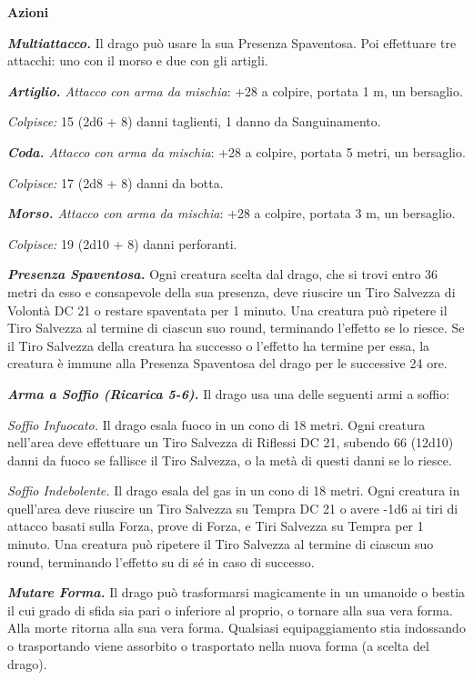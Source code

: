 \begin{multicols}{2}
	\textbf{Azioni}

	\textit{\textbf{Multiattacco.}} Il drago può usare la sua Presenza Spaventosa. Poi effettuare tre attacchi: uno con il morso e due con gli artigli.

	\textit{\textbf{Artiglio.} Attacco con arma da mischia}: +28 a colpire, portata 1 m, un bersaglio.

	\textit{Colpisce:} 15 (2d6 + 8) danni taglienti, 1 danno da Sanguinamento.

	\textit{\textbf{Coda.} Attacco con arma da mischia}: +28 a colpire, portata 5 metri, un bersaglio.

	\textit{Colpisce:} 17 (2d8 + 8) danni da botta.

	\textit{\textbf{Morso.} Attacco con arma da mischia}: +28 a colpire, portata 3 m, un bersaglio.

	\textit{Colpisce:} 19 (2d10 + 8) danni perforanti.

	\textit{\textbf{Presenza Spaventosa.}} Ogni creatura scelta dal drago, che si trovi entro 36 metri da esso e consapevole della sua presenza, deve riuscire un Tiro Salvezza di Volontà DC 21 o restare spaventata per 1 minuto. Una creatura può ripetere il Tiro Salvezza al termine di ciascun suo round, terminando l'effetto se lo riesce. Se il Tiro Salvezza della creatura ha successo o l'effetto ha termine per essa, la creatura è immune alla Presenza Spaventosa del drago per le successive 24 ore.

	\textit{\textbf{Arma a Soffio (Ricarica 5-6).}} Il drago usa una delle seguenti armi a soffio:

	\textit{Soffio Infuocato.} Il drago esala fuoco in un cono di 18 metri. Ogni creatura nell'area deve effettuare un Tiro Salvezza di Riflessi DC 21, subendo 66 (12d10) danni da fuoco se fallisce il Tiro Salvezza, o la metà di questi danni se lo riesce.

	\textit{Soffio Indebolente.} Il drago esala del gas in un cono di 18 metri. Ogni creatura in quell'area deve riuscire un Tiro Salvezza su Tempra DC 21 o avere -1d6 ai tiri di attacco basati sulla Forza, prove di Forza, e Tiri Salvezza su Tempra per 1 minuto. Una creatura può ripetere il Tiro Salvezza al termine di ciascun suo round, terminando l'effetto su di sé in caso di successo.

	\textit{\textbf{Mutare Forma.}} Il drago può trasformarsi magicamente in un umanoide o bestia il cui grado di sfida sia pari o inferiore al proprio, o tornare alla sua vera forma. Alla morte ritorna alla sua vera forma. Qualsiasi equipaggiamento stia indossando o trasportando viene assorbito o trasportato nella nuova forma (a scelta del drago).


\end{multicols}
